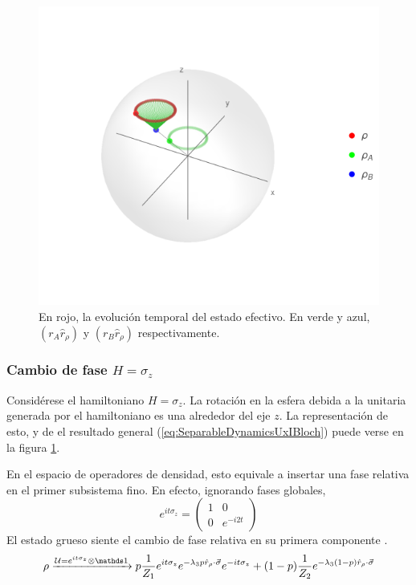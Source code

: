 \begin{figure}[h!]
    \centering
    \includegraphics[width=0.6\linewidth]{maxent/figures/U1xU2_H1=sz_H2=Id_z=0.9_p=0.4_sequence.png}
    \caption{En rojo, la evolución temporal del estado efectivo. En verde y azul, $(r_{A}\hat{r}_{\rho})$ y $(r_{B}\hat{r}_{\rho})$ respectivamente.}
    \label{fig:ZRot}
\end{figure}

\subsubsection{Cambio de fase $H=\sigma_{z}$}
Considérese el hamiltoniano $H=\sigma_{z}$. La rotación en la esfera debida a la unitaria generada por el hamiltoniano es una alrededor del eje $z$. La representación de esto, y de el resultado general (\ref{eq:SeparableDynamicsUxIBloch}) puede verse en la figura \ref{fig:ZRot}.


En el espacio de operadores de densidad, esto equivale a insertar una fase relativa en el primer subsistema fino. En efecto, ignorando fases globales,
\begin{equation}
    e^{it\sigma_{z}}=\begin{pmatrix}
        1&0\\0&e^{-i2t}
    \end{pmatrix}
\end{equation}
El estado grueso siente el cambio de fase relativa en su primera componente .
\begin{equation}
    \rho\xrightarrow{\mcU=e^{it\sigma_{z}}\otimes \Id} p\frac{1}{Z_{1}}e^{it\sigma_{z}}e^{-\lambda_{3}p\hat{r}_{\rho}\cdot\vec{\sigma}}e^{-it\sigma_{z}}+(1-p)\frac{1}{Z_{2}}e^{-\lambda_{3}(1-p)\hat{r}_{\rho}\cdot\vec{\sigma}}
\end{equation}

